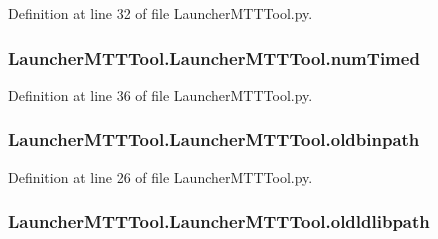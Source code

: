 Definition at line 32 of file Launcher\-M\-T\-T\-Tool.\-py.

\hypertarget{class_launcher_m_t_t_tool_1_1_launcher_m_t_t_tool_ae2be62c3d068b4c1c3d7c1ddaf4cfdbe}{
\subsubsection[{num\-Timed}]{\setlength{\rightskip}{0pt plus 5cm}Launcher\-M\-T\-T\-Tool.\-Launcher\-M\-T\-T\-Tool.\-num\-Timed}}\label{class_launcher_m_t_t_tool_1_1_launcher_m_t_t_tool_ae2be62c3d068b4c1c3d7c1ddaf4cfdbe}


Definition at line 36 of file Launcher\-M\-T\-T\-Tool.\-py.

\hypertarget{class_launcher_m_t_t_tool_1_1_launcher_m_t_t_tool_acf34764e2b173537cbf5720cc0a1235d}{
\subsubsection[{oldbinpath}]{\setlength{\rightskip}{0pt plus 5cm}Launcher\-M\-T\-T\-Tool.\-Launcher\-M\-T\-T\-Tool.\-oldbinpath}}\label{class_launcher_m_t_t_tool_1_1_launcher_m_t_t_tool_acf34764e2b173537cbf5720cc0a1235d}


Definition at line 26 of file Launcher\-M\-T\-T\-Tool.\-py.

\hypertarget{class_launcher_m_t_t_tool_1_1_launcher_m_t_t_tool_abb2e78c53544b045ef3ab42ed8b68806}{
\subsubsection[{oldldlibpath}]{\setlength{\rightskip}{0pt plus 5cm}Launcher\-M\-T\-T\-Tool.\-Launcher\-M\-T\-T\-Tool.\-oldldlibpath}}\label{class_launcher_m_t_t_tool_1_1_launcher_m_t_t_tool_abb2e78c53544b045ef3ab42ed8b68806}


